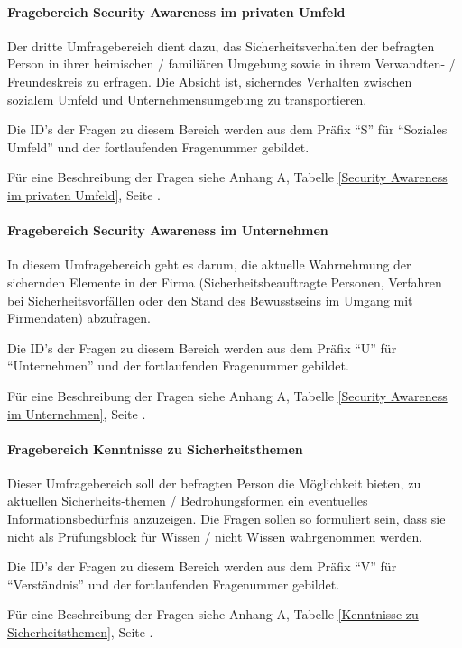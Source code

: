 \documentclass[../../main.tex]{subfiles}
\begin{document}
\paragraph*{Fragebereich Security Awareness im privaten Umfeld}\mbox{}

\begin{sloppypar}
Der dritte Umfragebereich dient dazu, das Sicherheitsverhalten der befragten Person in ihrer heimischen / familiären Umgebung sowie in ihrem Verwandten- / Freundeskreis zu erfragen. Die Absicht ist, sicherndes Verhalten zwischen sozialem Umfeld und Unternehmensumgebung zu transportieren.

Die ID's der Fragen zu diesem Bereich werden aus dem Präfix "`S"' für "`Soziales Umfeld"' und der fortlaufenden Fragenummer gebildet.

Für eine Beschreibung der Fragen siehe Anhang A, Tabelle \ref{Security Awareness im privaten Umfeld}, Seite \pageref{Security Awareness im privaten Umfeld}.
\end{sloppypar}


\paragraph*{Fragebereich Security Awareness im Unternehmen}\mbox{}

\begin{sloppypar}
In diesem Umfragebereich geht es darum, die aktuelle Wahrnehmung der sichernden Elemente in der Firma (Sicherheitsbeauftragte Personen, Verfahren bei Sicherheitsvorfällen oder den Stand des Bewusstseins im Umgang mit Firmendaten) abzufragen.

Die ID's der Fragen zu diesem Bereich werden aus dem Präfix "`U"' für "`Unternehmen"' und der fortlaufenden Fragenummer gebildet.

Für eine Beschreibung der Fragen siehe Anhang A, Tabelle \ref{Security Awareness im Unternehmen}, Seite \pageref{Security Awareness im Unternehmen}.
\end{sloppypar}



\paragraph*{Fragebereich Kenntnisse zu Sicherheitsthemen}\mbox{}

\begin{sloppypar}
Dieser Umfragebereich soll der befragten Person die Möglichkeit bieten, zu aktuellen Sicherheits-themen / Bedrohungsformen ein eventuelles Informationsbedürfnis anzuzeigen. Die Fragen sollen so formuliert sein, dass sie nicht als Prüfungsblock für Wissen / nicht Wissen wahrgenommen werden.

Die ID's der Fragen zu diesem Bereich werden aus dem Präfix "`V"' für "`Verständnis"' und der fortlaufenden Fragenummer gebildet.

Für eine Beschreibung der Fragen siehe Anhang A, Tabelle \ref{Kenntnisse zu Sicherheitsthemen}, Seite \pageref{Kenntnisse zu Sicherheitsthemen}.
\end{sloppypar}
\end{document}
